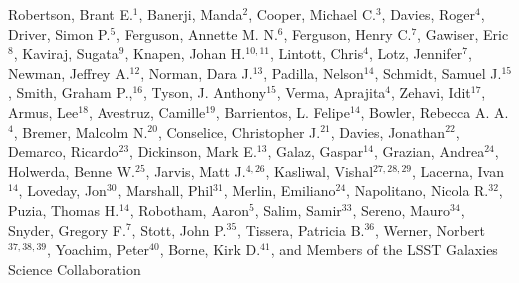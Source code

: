 Robertson, Brant E.$^{1}$, 
Banerji, Manda$^{2}$,
Cooper, Michael C.$^{3}$,
Davies, Roger$^{4}$,
Driver, Simon P.$^{5}$,
Ferguson, Annette M. N.$^{6}$,
Ferguson, Henry C.$^{7}$,
Gawiser, Eric$^{8}$,
Kaviraj, Sugata$^{9}$,
Knapen, Johan H.$^{10,11}$,
Lintott, Chris$^{4}$,
Lotz, Jennifer$^{7}$,
Newman, Jeffrey A.$^{12}$,
Norman, Dara J.$^{13}$,
Padilla, Nelson$^{14}$,
Schmidt, Samuel J.$^{15}$,
Smith, Graham P.,$^{16}$,
Tyson, J. Anthony$^{15}$,
Verma, Aprajita$^{4}$,
Zehavi, Idit$^{17}$,
Armus, Lee$^{18}$,
Avestruz, Camille$^{19}$,
Barrientos, L. Felipe$^{14}$,
Bowler, Rebecca A. A.$^{4}$,
Bremer, Malcolm N.$^{20}$,
Conselice, Christopher J.$^{21}$,
Davies, Jonathan$^{22}$,
Demarco, Ricardo$^{23}$,
Dickinson, Mark E.$^{13}$,
Galaz, Gaspar$^{14}$,
Grazian, Andrea$^{24}$,
Holwerda, Benne W.$^{25}$,
Jarvis, Matt J.$^{4,26}$,
Kasliwal, Vishal$^{27,28,29}$,
Lacerna, Ivan$^{14}$,
Loveday, Jon$^{30}$,
Marshall, Phil$^{31}$,
Merlin, Emiliano$^{24}$,
Napolitano, Nicola R.$^{32}$,
Puzia, Thomas H.$^{14}$,
Robotham, Aaron$^{5}$,
Salim, Samir$^{33}$,
Sereno, Mauro$^{34}$,
Snyder, Gregory F.$^{7}$,
Stott, John P.$^{35}$,
Tissera, Patricia B.$^{36}$,
Werner, Norbert$^{37,38,39}$,
Yoachim, Peter$^{40}$,
Borne, Kirk D.$^{41}$,
and Members of the LSST Galaxies Science Collaboration 

\vspace*{4mm}

